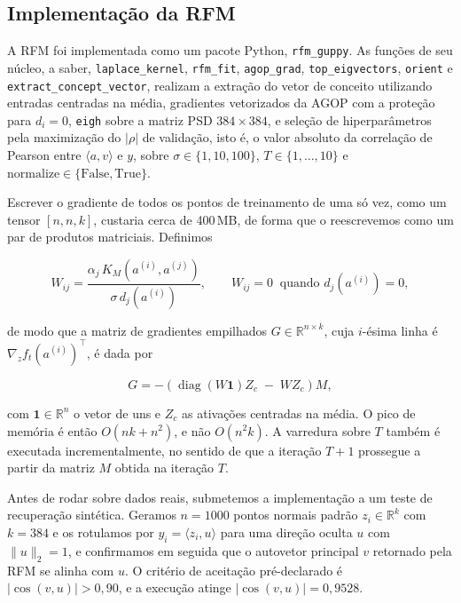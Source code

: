 \subsection{Implementação da RFM}

A RFM foi implementada como um pacote Python, \verb|rfm_guppy|. As funções de seu núcleo,
a saber, \verb|laplace_kernel|, \verb|rfm_fit|, \verb|agop_grad|, \verb|top_eigvectors|,
\verb|orient| e \verb|extract_concept_vector|, realizam a extração do vetor de conceito
utilizando entradas centradas na média, gradientes vetorizados da AGOP com a proteção para
$d_i = 0$, \verb|eigh| sobre a matriz PSD $384 \times 384$, e seleção de hiperparâmetros
pela maximização do $|\rho|$ de validação, isto é, o valor absoluto da correlação de
Pearson entre $\langle a, v \rangle$ e $y$, sobre $\sigma \in \{1, 10, 100\}$,
$T \in \{1, \dots, 10\}$ e $\mathrm{normalize} \in \{\mathrm{False}, \mathrm{True}\}$.

Escrever o gradiente de todos os pontos de treinamento de uma só vez, como um tensor
$[n, n, k]$, custaria cerca de 400\,MB, de forma que o reescrevemos como um par de
produtos matriciais. Definimos

\[
  W_{ij} = \frac{\alpha_j \, K_M\!\left(a^{(i)}, a^{(j)}\right)}
                {\sigma \, d_j\!\left(a^{(i)}\right)},
  \qquad
  W_{ij} = 0 \ \text{ quando } d_j\!\left(a^{(i)}\right) = 0,
\]

de modo que a matriz de gradientes empilhados $G \in \mathbb{R}^{n \times k}$, cuja
$i$-ésima linha é $\nabla_z f_t(a^{(i)})^{\top}$, é dada por

\[
  G = -\left(\operatorname{diag}\!\left(W \mathbf{1}\right) Z_c \;-\; W Z_c\right) M ,
\]

com $\mathbf{1} \in \mathbb{R}^{n}$ o vetor de uns e $Z_c$ as ativações centradas na
média. O pico de memória é então $O(nk + n^2)$, e não $O(n^2 k)$. A varredura sobre $T$
também é executada incrementalmente, no sentido de que a iteração $T+1$ prossegue a partir
da matriz $M$ obtida na iteração $T$.

Antes de rodar sobre dados reais, submetemos a implementação a um teste de recuperação
sintética. Geramos $n = 1000$ pontos normais padrão $z_i \in \mathbb{R}^{k}$ com $k = 384$
e os rotulamos por $y_i = \langle z_i, u \rangle$ para uma direção oculta $u$ com
$\|u\|_2 = 1$, e confirmamos em seguida que o autovetor principal $v$ retornado pela RFM
se alinha com $u$. O critério de aceitação pré-declarado é $|\cos(v, u)| > 0{,}90$, e a
execução atinge $|\cos(v, u)| = 0{,}9528$.

